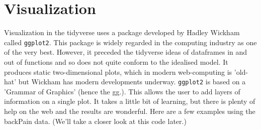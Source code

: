 \documentclass[titlepage]{book}\usepackage{knitr}
\begin{document}
\begin{knitrout}
\color{fgcolor}
\end{knitrout}

\section{Visualization}

Visualization in the tidyverse uses a package developed by Hadley Wickham called \texttt{ggplot2}. This package is widely regarded in the computing industry as one of the very best.  However, it preceded the tidyverse ideas of dataframes in and out of functions and so does not quite conform to the idealised model. It produces static two-dimensional plots, which in modern web-computing is 'old-hat' but Wickham has modern developments underway. 
\texttt{ggplot2} is based on a 'Grammar of Graphics' (hence the gg.). This allows the user to add layers of information on a single plot.  It takes a little bit of learning, but there is plenty of help on the web and the results are wonderful.
Here are a few examples using the backPain data. (We'll take a closer look at this code later.)
\end{document}
